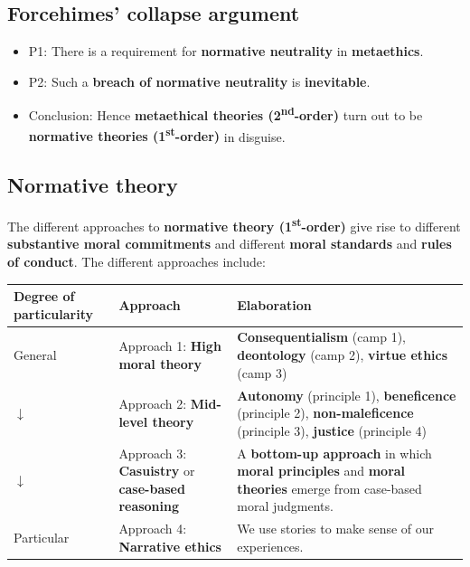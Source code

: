 \documentclass[11pt]{article}
\begin{document}
\subsection{Forcehimes' collapse argument}
\label{sec:org028b8e4}
\begin{itemize}
\item P1: There is a requirement for \textbf{normative neutrality} in \textbf{metaethics}.
\item P2: Such a \textbf{breach of normative neutrality} is \textbf{inevitable}.
\item Conclusion: Hence \textbf{metaethical theories (2\textsuperscript{nd}-order)} turn out to be \textbf{normative theories (1\textsuperscript{st}-order)} in disguise.
\end{itemize}
\subsection{Normative theory}
\label{sec:org7310185}
The different approaches to \textbf{normative theory (1\textsuperscript{st}-order)} give rise to different \textbf{substantive moral commitments} and different \textbf{moral standards} and \textbf{rules of conduct}. The different approaches include:

\begin{center}
\begin{tabularx}{\textwidth}{|X|X|X|}
\hline
Degree of particularity & Approach & Elaboration\\
\hline
General & Approach 1: \textbf{High moral theory} & \textbf{Consequentialism} (camp 1), \textbf{deontology} (camp 2), \textbf{virtue ethics} (camp 3)\\
\hline
\(\downarrow\) & Approach 2: \textbf{Mid-level theory} & \textbf{Autonomy} (principle 1), \textbf{beneficence} (principle 2), \textbf{non-maleficence} (principle 3), \textbf{justice} (principle 4)\\
\hline
\(\downarrow\) & Approach 3: \textbf{Casuistry} or \textbf{case-based reasoning} & A \textbf{bottom-up approach} in which \textbf{moral principles} and \textbf{moral theories} emerge from case-based moral judgments.\\
\hline
Particular & Approach 4: \textbf{Narrative ethics} & We use stories to make sense of our experiences.\\
\hline
\end{tabularx}
\end{center}
 \newpage
\end{document}

